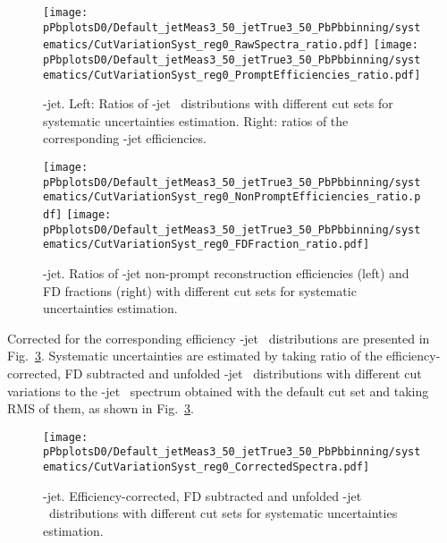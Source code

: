 \begin{figure}[bth]
\begin{center}
\texttt{[image: pPbplotsD0/Default\_jetMeas3\_50\_jetTrue3\_50\_PbPbbinning/systematics/CutVariationSyst\_reg0\_RawSpectra\_ratio.pdf]}
\texttt{[image: pPbplotsD0/Default\_jetMeas3\_50\_jetTrue3\_50\_PbPbbinning/systematics/CutVariationSyst\_reg0\_PromptEfficiencies\_ratio.pdf]}
\caption{\Dzero-jet. Left: Ratios of \Dzero-jet \pt\ distributions with different cut sets for systematic uncertainties estimation. Right: ratios of the corresponding \Dzero-jet efficiencies.} 
\label{fig:PbPb_JetPtRawSysRatio_Dzero}
\end{center}
\end{figure}

\begin{figure}[bth]
\begin{center}
\texttt{[image: pPbplotsD0/Default\_jetMeas3\_50\_jetTrue3\_50\_PbPbbinning/systematics/CutVariationSyst\_reg0\_NonPromptEfficiencies\_ratio.pdf]}
\texttt{[image: pPbplotsD0/Default\_jetMeas3\_50\_jetTrue3\_50\_PbPbbinning/systematics/CutVariationSyst\_reg0\_FDFraction\_ratio.pdf]}
\caption{\Dzero-jet. Ratios of \Dzero-jet non-prompt reconstruction efficiencies (left) and FD fractions (right) with different cut sets for systematic uncertainties estimation.} 
\label{fig:PbPb_JetcutVarFD_Dzero}
\end{center}
\end{figure} 

Corrected for the corresponding efficiency \Dzero-jet \ptchjet\ distributions are presented in Fig.~\ref{fig:PbPb_JetPtSys_Dzero}. Systematic uncertainties are estimated by taking ratio of the efficiency-corrected, FD subtracted and unfolded \Dzero-jet \ptchjet\ distributions with different cut variations to the \Dzero-jet \pt\ spectrum obtained with the default cut set and taking RMS of them, as shown in Fig.~\ref{fig:PbPb_JetPtSys_Dzero}.

\begin{figure}[bth]
\begin{center}
\texttt{[image: pPbplotsD0/Default\_jetMeas3\_50\_jetTrue3\_50\_PbPbbinning/systematics/CutVariationSyst\_reg0\_CorrectedSpectra.pdf]}
\caption{\Dzero-jet. Efficiency-corrected, FD subtracted and unfolded \Dzero-jet \pt\ distributions with different cut sets for systematic uncertainties estimation.} 
\label{fig:PbPb_JetPtSys_Dzero}
\end{center}
\end{figure}

